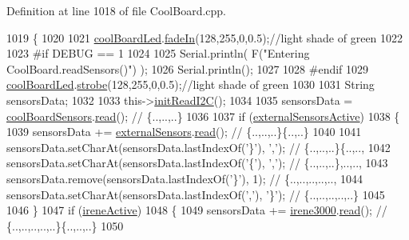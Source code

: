 Definition at line 1018 of file Cool\+Board.\+cpp.


\begin{DoxyCode}
1019 \{
1020 
1021     \hyperlink{class_cool_board_a1b1d3c684a5baa56b08486e192fd8e97}{coolBoardLed}.\hyperlink{class_cool_board_led_ab778f5e7bed0ab74e3906d82110493c3}{fadeIn}(128,255,0,0.5);\textcolor{comment}{//light shade of green}
1022                 
1023 \textcolor{preprocessor}{#if DEBUG == 1}
1024 
1025     Serial.println( F(\textcolor{stringliteral}{"Entering CoolBoard.readSensors()"}) );
1026     Serial.println();
1027 
1028 \textcolor{preprocessor}{#endif}
1029     \hyperlink{class_cool_board_a1b1d3c684a5baa56b08486e192fd8e97}{coolBoardLed}.\hyperlink{class_cool_board_led_ad5f0de4c628cbfbf49896042831c64ad}{strobe}(128,255,0,0.5);\textcolor{comment}{//light shade of green}
1030 
1031     String sensorsData;
1032     
1033     this->\hyperlink{class_cool_board_a397b46fadab8f530a8cf4d914c561366}{initReadI2C}();
1034 
1035     sensorsData = \hyperlink{class_cool_board_af102be5288bd7f7a8e59b13f86e26a00}{coolBoardSensors}.\hyperlink{class_cool_board_sensors_a91badb2539d91fda8679f2a597874c48}{read}(); \textcolor{comment}{// \{..,..,..\}}
1036     
1037     \textcolor{keywordflow}{if} (\hyperlink{class_cool_board_a638b00b76aeb819ecfd4c10b8cdd7bb7}{externalSensorsActive})
1038     \{
1039         sensorsData += \hyperlink{class_cool_board_a09e26264839c65873eb56af476eff6b2}{externalSensors}.\hyperlink{class_external_sensors_a53177b81eca3be89508b5511ddcd00fc}{read}(); \textcolor{comment}{// \{..,..,..\}\{..,..\}}
1040 
1041         sensorsData.setCharAt(sensorsData.lastIndexOf(\textcolor{charliteral}{'\}'}), \textcolor{charliteral}{','}); \textcolor{comment}{// \{..,..,..\}\{..,..,}
1042         sensorsData.setCharAt(sensorsData.lastIndexOf(\textcolor{charliteral}{'\{'}), \textcolor{charliteral}{','}); \textcolor{comment}{// \{..,..,..\},..,..,}
1043         sensorsData.remove(sensorsData.lastIndexOf(\textcolor{charliteral}{'\}'}), 1); \textcolor{comment}{// \{..,..,..,..,..,}
1044         sensorsData.setCharAt(sensorsData.lastIndexOf(\textcolor{charliteral}{','}), \textcolor{charliteral}{'\}'}); \textcolor{comment}{// \{..,..,..,..,..\}}
1045 
1046     \}
1047     \textcolor{keywordflow}{if} (\hyperlink{class_cool_board_a9c3f7ac625481ee2ae802a25d97a4ae0}{ireneActive})
1048     \{
1049         sensorsData += \hyperlink{class_cool_board_ad103718ce316006c4695b8eb312eaf11}{irene3000}.\hyperlink{class_irene3000_a852a170feea994ea1df01c6b245b5d9a}{read}(); \textcolor{comment}{// \{..,..,..,..,..\}\{..,..,..\}}
1050 

\end{DoxyCode}
